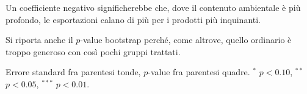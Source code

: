 \begin{table}[htbp]
\begin{threeparttable}
\begin{tablenotes}[flushleft]
\item Un coefficiente negativo significherebbe che, dove il contenuto ambientale \`e pi\`u profondo, le esportazioni calano di pi\`u per i prodotti pi\`u inquinanti.
\item Si riporta anche il $p$-value bootstrap perch\'e, come altrove, quello ordinario \`e troppo generoso con cos\`i pochi gruppi trattati.
\item Errore standard fra parentesi tonde, $p$-value fra parentesi quadre. $^{*}$ $p<0.10$, $^{**}$ $p<0.05$, $^{***}$ $p<0.01$.
\end{tablenotes}
\end{threeparttable}
\end{table}
